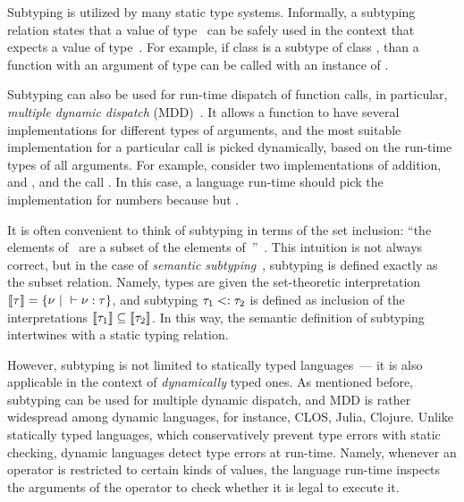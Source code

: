 Subtyping is utilized by many static type systems.
Informally, a subtyping relation  states that
a value of type~ can be safely used
in the context that expects a value of type~.
For example, if class  is a subtype of class ,
than a function with an argument of type 
can be called with an instance of . 

Subtyping can also be used for run-time dispatch of function calls, 
in particular, \emph{multiple dynamic dispatch} 
(MDD)~\cite{bib:Chambers:1992:Cecil,bib:Clifton:2000:MultiJava}.
It allows a function to have several implementations 
for different types of arguments,
and the most suitable implementation for a particular call 
is picked dynamically, based on the run-time types of all arguments.
For example, consider two implementations of addition,
 and ,
and the call .
In this case, a language run-time should pick 
the implementation for numbers 
because  but .

It is often convenient to think of subtyping 
in terms of the set inclusion: ``the elements of~ are a subset
of the elements of~''~\cite{bib:Pierce:2002:TAPL}.
This intuition is not always correct, but in the case of
\emph{semantic subtyping}~\cite{bib:Hosoya:2003:XDuce,
  bib:Frisch:2008:sem-sub, bib:Ancona:2016:sem-sub-oo}, 
subtyping is defined exactly as the subset relation. %
Namely, types are given the set-theoretic interpretation
$\llbracket \tau \rrbracket = \{\nu ~\vert~ \vdash \nu : \tau \}$, 
and subtyping $\tau_1 <: \tau_2$ is defined as inclusion 
of the interpretations
$\llbracket \tau_1 \rrbracket \subseteq \llbracket \tau_2 \rrbracket$.
In this way, the semantic definition of subtyping intertwines with 
a static typing relation.

However, subtyping is not limited to statically typed languages~---
it is also applicable in the context of \emph{dynamically} typed ones.
As mentioned before, subtyping can be used for multiple dynamic dispatch,
and MDD is rather widespread among dynamic languages, for instance,
CLOS, Julia, Clojure.
Unlike statically typed languages, 
which conservatively prevent type errors with static checking,
dynamic languages detect type errors at run-time.
Namely, whenever an operator is restricted to certain kinds of values,
the language run-time inspects the arguments of the operator
to check whether it is legal to execute it.


